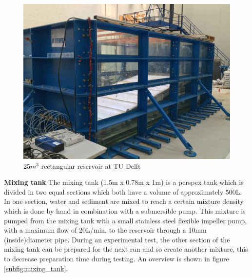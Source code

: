 \begin{figure}[ht!]
    \centering
    \includegraphics[width=\textwidth]{Images/Reservoir_tank.jpg}
    \caption{25$m^3$ rectangular reservoir at TU Delft}
    \label{fig:reservoir_tank}
\end{figure}


\noindent\textbf{Mixing tank} \newline
\noindent The mixing tank (1.5m x 0.78m x 1m) is a perspex tank which is divided in two equal sections which both have a volume of approximately 500L. In one section, water and sediment are mixed to reach a certain mixture density which is done by hand in combination with a submersible pump. This mixture is pumped from the mixing tank with a small stainless steel flexible impeller pump, with a maximum flow of 20L/min, to the reservoir through a 10mm (inside)diameter pipe. During an experimental test, the other section of the mixing tank can be prepared for the next run and so create another mixture, this to decrease preparation time during testing. An overview is shown in figure \ref{subfig:mixing_tank}.


